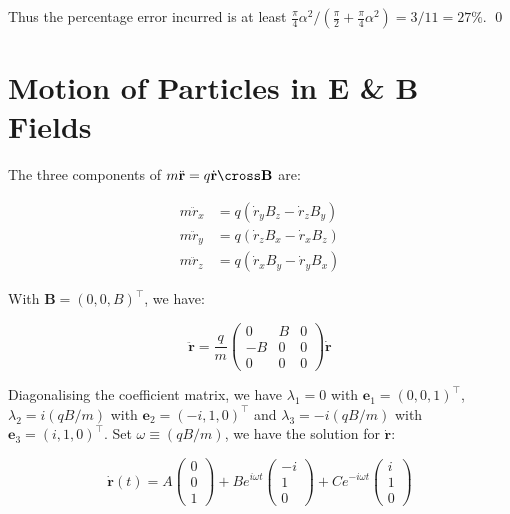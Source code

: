 \documentclass[12pt]{article}
\begin{document}
Thus the percentage error incurred is at least $\frac{\pi}{4} \alpha^{2}/(\frac{\pi}{2} + \frac{\pi}{4} \alpha^{2}) = 3/11 = 27\%$.
\qed


\pagebreak
\section*{Motion of Particles in E \& B Fields}


The three components of $m \ddot{\mathbf{r}} = q \dot{\mathbf{r}} \cross \mathbf{B}$ are:

\begin{equation}
\begin{split}
    m \ddot{r}_{x} &= q \left( \dot{r}_{y} B_{z} - \dot{r}_{z} B_{y} \right) \\
    m \ddot{r}_{y} &= q \left( \dot{r}_{z} B_{x} - \dot{r}_{x} B_{z} \right) \\
    m \ddot{r}_{z} &= q \left( \dot{r}_{x} B_{y} - \dot{r}_{y} B_{x} \right)
\end{split}
\end{equation}

With $\mathbf{B} = (0, 0, B)^{\intercal}$, we have:

\begin{equation}
    \ddot{\mathbf{r}}
    =
    \frac{q}{m}
    \begin{pmatrix}
        0 & B & 0 \\
        -B & 0 & 0 \\
        0 & 0 & 0
    \end{pmatrix}
    \dot{\mathbf{r}}
\end{equation}

Diagonalising the coefficient matrix, we have $\lambda_{1} = 0$ with $\mathbf{e}_{1} = (0, 0, 1)^{\intercal}$, $\lambda_{2} = i(qB/m)$ with $\mathbf{e}_{2} = (-i, 1, 0)^{\intercal}$ and $\lambda_{3} = -i(qB/m)$ with $\mathbf{e}_{3} = (i, 1, 0)^{\intercal}$. Set $\omega \equiv (qB/m)$, we have the solution for $\dot{\mathbf{r}}$:

\begin{equation}
    \dot{\mathbf{r}}(t) = 
    A
    \begin{pmatrix}
        0 \\
        0 \\
        1
    \end{pmatrix}
    +
    B e^{i\omega t}
    \begin{pmatrix}
        -i \\
        1 \\
        0
    \end{pmatrix}
    +
    C e^{-i\omega t}
    \begin{pmatrix}
        i \\
        1 \\
        0
    \end{pmatrix}
\end{equation}
\end{document}

